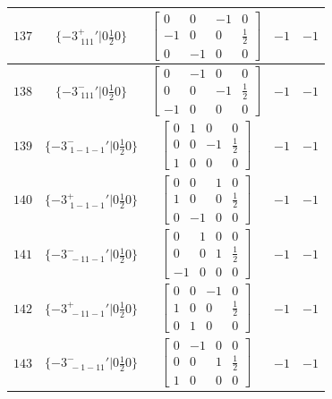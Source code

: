 \documentclass[fleqn,8pt]{jsarticle}
\begin{document}
\begin{longtable}{ccccc}
$ 137 $ & $ \{-3^{+}_{\,\,111}{}'|0 \frac{1}{2} 0\} $ & $ \begin{bmatrix} 0 & 0 & -1 & 0 \\ -1 & 0 & 0 & \frac{1}{2} \\ 0 & -1 & 0 & 0 \end{bmatrix} $ & $ -1 $ & $ -1 $ \\ \hline
$ 138 $ & $ \{-3^{-}_{\,\,111}{}'|0 \frac{1}{2} 0\} $ & $ \begin{bmatrix} 0 & -1 & 0 & 0 \\ 0 & 0 & -1 & \frac{1}{2} \\ -1 & 0 & 0 & 0 \end{bmatrix} $ & $ -1 $ & $ -1 $ \\ \hline
$ 139 $ & $ \{-3^{-}_{\,\,1-1-1}{}'|0 \frac{1}{2} 0\} $ & $ \begin{bmatrix} 0 & 1 & 0 & 0 \\ 0 & 0 & -1 & \frac{1}{2} \\ 1 & 0 & 0 & 0 \end{bmatrix} $ & $ -1 $ & $ -1 $ \\ \hline
$ 140 $ & $ \{-3^{+}_{\,\,1-1-1}{}'|0 \frac{1}{2} 0\} $ & $ \begin{bmatrix} 0 & 0 & 1 & 0 \\ 1 & 0 & 0 & \frac{1}{2} \\ 0 & -1 & 0 & 0 \end{bmatrix} $ & $ -1 $ & $ -1 $ \\ \hline
$ 141 $ & $ \{-3^{-}_{\,\,-11-1}{}'|0 \frac{1}{2} 0\} $ & $ \begin{bmatrix} 0 & 1 & 0 & 0 \\ 0 & 0 & 1 & \frac{1}{2} \\ -1 & 0 & 0 & 0 \end{bmatrix} $ & $ -1 $ & $ -1 $ \\ \hline
$ 142 $ & $ \{-3^{+}_{\,\,-11-1}{}'|0 \frac{1}{2} 0\} $ & $ \begin{bmatrix} 0 & 0 & -1 & 0 \\ 1 & 0 & 0 & \frac{1}{2} \\ 0 & 1 & 0 & 0 \end{bmatrix} $ & $ -1 $ & $ -1 $ \\ \hline
$ 143 $ & $ \{-3^{-}_{\,\,-1-11}{}'|0 \frac{1}{2} 0\} $ & $ \begin{bmatrix} 0 & -1 & 0 & 0 \\ 0 & 0 & 1 & \frac{1}{2} \\ 1 & 0 & 0 & 0 \end{bmatrix} $ & $ -1 $ & $ -1 $ \\ \hline

\end{longtable}
\end{document}
